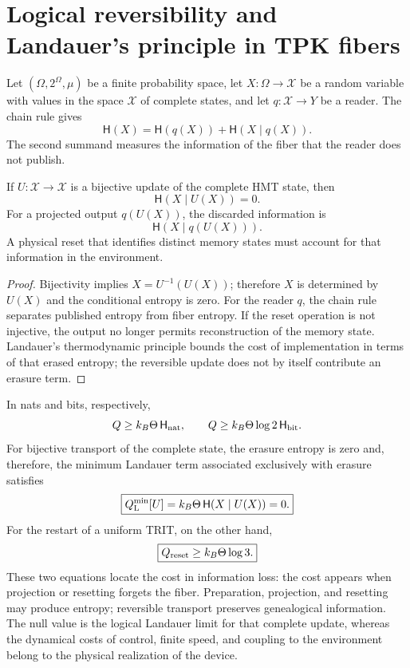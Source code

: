 \section{Logical reversibility and Landauer's principle in TPK fibers}
\label{sec:informacion-fibra-landauer-rev7}

Let \((\Omega,2^\Omega,\mu)\) be a finite probability space, let
\(X:\Omega\to\mathcal X\) be a random variable with values in the space
\(\mathcal X\) of complete states, and let \(q:\mathcal X\to Y\) be a reader.
The chain rule gives
\[
 \mathsf H(X)
 =
 \mathsf H(q(X))+\mathsf H(X\mid q(X)).
\]
The second summand measures the information of the fiber that the reader does not
publish.

\begin{theorem}
\label{thm:landauer-relativo-lector-rev7}
If \(U:\mathcal X\to\mathcal X\) is a bijective update of the complete
HMT state,
then
\[
 \boxed{\mathsf H(X\mid U(X))=0.}
\]
For a projected output \(q(U(X))\), the discarded information is
\[
 \mathsf H(X\mid q(U(X))).
\]
A physical reset that identifies distinct memory states must
account for that information in the environment.
\end{theorem}

\begin{proof}
Bijectivity implies
\(X=U^{-1}(U(X))\); therefore \(X\) is determined by \(U(X)\) and the
conditional entropy is zero. For the reader \(q\), the chain rule
separates published entropy from fiber entropy. If the reset operation is
not injective, the output no longer permits reconstruction of the memory
state. Landauer's thermodynamic principle bounds the cost of implementation in
terms of that erased entropy; the reversible update does not by itself
contribute an erasure term.
\end{proof}

In nats and bits, respectively,
\[
 Q\ge k_B\Theta\,\mathsf H_{\rm nat},
 \qquad
 Q\ge k_B\Theta\log 2\,\mathsf H_{\rm bit}.
\]
For bijective transport of the complete state, the erasure entropy is
zero and, therefore, the minimum Landauer term associated exclusively with
erasure satisfies
\[
\boxed{Q_{\rm L}^{\min}[U]=k_B\Theta\,
 \mathsf H(X\mid U(X))=0.}
\]
For the restart of a uniform TRIT, on the other hand,
\[
 \boxed{Q_{\rm reset}\ge k_B\Theta\log3.}
\]
These two equations locate the cost in information loss: the cost appears when projection or resetting forgets the fiber. Preparation, projection, and resetting may produce entropy; reversible transport preserves genealogical information. The null value is the logical Landauer limit for that complete update, whereas the dynamical costs of control, finite speed, and coupling to the environment belong to the physical realization of the device.

